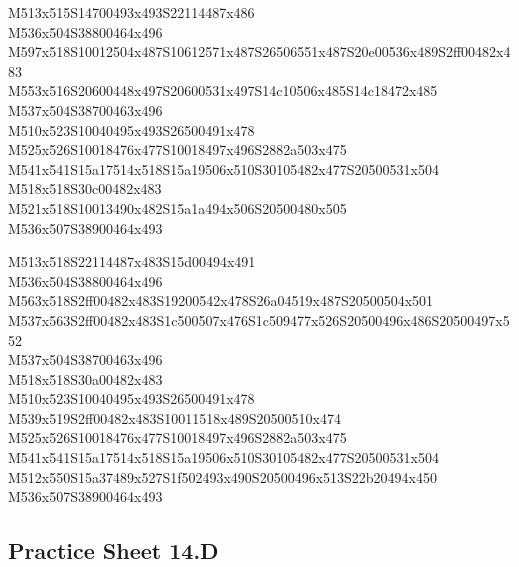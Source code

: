 \documentclass{article}
\begin{document}
\begin{multicols}{5}
\begin{center}
M513x515S14700493x493S22114487x486 %
\\M536x504S38800464x496 %
\\M597x518S10012504x487S10612571x487S26506551x487S20e00536x489S2ff00482x483 %
\\M553x516S20600448x497S20600531x497S14c10506x485S14c18472x485 %
\\M537x504S38700463x496 %
\\M510x523S10040495x493S26500491x478 %
\\M525x526S10018476x477S10018497x496S2882a503x475 %
\\M541x541S15a17514x518S15a19506x510S30105482x477S20500531x504 %
\\M518x518S30c00482x483 %
\\M521x518S10013490x482S15a1a494x506S20500480x505 %
\\M536x507S38900464x493 %
\vfil
\columnbreak

M513x518S22114487x483S15d00494x491 %
\\M536x504S38800464x496 %
\\M563x518S2ff00482x483S19200542x478S26a04519x487S20500504x501 %
\\M537x563S2ff00482x483S1c500507x476S1c509477x526S20500496x486S20500497x552 %
\\M537x504S38700463x496 %
\\M518x518S30a00482x483 %
\\M510x523S10040495x493S26500491x478 %
\\M539x519S2ff00482x483S10011518x489S20500510x474 %
\\M525x526S10018476x477S10018497x496S2882a503x475 %
\\M541x541S15a17514x518S15a19506x510S30105482x477S20500531x504 %
\\M512x550S15a37489x527S1f502493x490S20500496x513S22b20494x450 %
\\M536x507S38900464x493 %
\vfil

\end{center}
\end{multicols}

\subsection{Practice Sheet 14.D}
\end{document}
